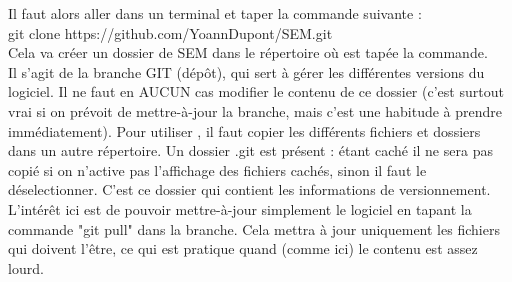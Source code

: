 \documentclass[manual-fr.tex]{subfiles}
\begin{document}
Il faut alors aller dans un terminal et taper la commande suivante :\\

git clone https://github.com/YoannDupont/SEM.git\\

Cela va créer un dossier de SEM dans le répertoire où est tapée la commande. \\

Il s'agit de la branche GIT (dépôt), qui sert à gérer les différentes versions du logiciel. Il ne faut en AUCUN cas modifier le contenu de ce dossier (c'est surtout vrai si on prévoit de mettre-à-jour la branche, mais c'est une habitude à prendre immédiatement). Pour utiliser \SEM, il faut copier les différents fichiers et dossiers dans un autre répertoire. Un dossier .git est présent : étant caché il ne sera pas copié si on n'active pas l'affichage des fichiers cachés, sinon il faut le déselectionner. C'est ce dossier qui contient les informations de versionnement.\\

L'intérêt ici est de pouvoir mettre-à-jour simplement le logiciel en tapant la commande "git pull" dans la branche. Cela mettra à jour uniquement les fichiers qui doivent l'être, ce qui est pratique quand (comme ici) le contenu est assez lourd.
\end{document}
